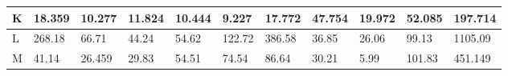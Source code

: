 \begin{landscape}
\begin{longtable}[c]{|l|llllllllll|}
  K                                                                               & \multicolumn{1}{l|}{18.359}                                                         & \multicolumn{1}{l|}{10.277}                                                         & \multicolumn{1}{l|}{11.824}                                                         & \multicolumn{1}{l|}{10.444}                                                         & \multicolumn{1}{l|}{9.227}                                                          & \multicolumn{1}{l|}{17.772}                                                         & \multicolumn{1}{l|}{47.754}                                    & \multicolumn{1}{l|}{19.972}                                    & \multicolumn{1}{l|}{52.085}                                        & 197.714                                                                                \\ \hline
  L                                                                               & \multicolumn{1}{l|}{268.18}                                                         & \multicolumn{1}{l|}{66.71}                                                          & \multicolumn{1}{l|}{44.24}                                                          & \multicolumn{1}{l|}{54.62}                                                          & \multicolumn{1}{l|}{122.72}                                                         & \multicolumn{1}{l|}{386.58}                                                         & \multicolumn{1}{l|}{36.85}                                     & \multicolumn{1}{l|}{26.06}                                     & \multicolumn{1}{l|}{99.13}                                         & 1105.09                                                                                \\ \hline
  M                                                                               & \multicolumn{1}{l|}{41.14}                                                          & \multicolumn{1}{l|}{26.459}                                                         & \multicolumn{1}{l|}{29.83}                                                          & \multicolumn{1}{l|}{54.51}                                                          & \multicolumn{1}{l|}{74.54}                                                          & \multicolumn{1}{l|}{86.64}                                                          & \multicolumn{1}{l|}{30.21}                                     & \multicolumn{1}{l|}{5.99}                                      & \multicolumn{1}{l|}{101.83}                                        & 451.149                                                                                \\ \hline

\end{longtable}
\end{landscape}
